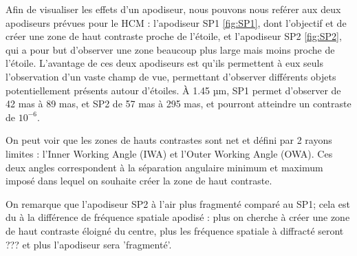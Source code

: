 Afin de visualiser les effets d'un apodiseur, nous pouvons nous reférer 
aux deux apodiseurs prévues pour le HCM : l'apodiseur SP1 \ref{fig:SP1}, dont l'objectif et de créer une zone de haut contraste proche de l'étoile, et l'apodiseur SP2 \ref{fig:SP2}, qui a pour but d'observer une zone beaucoup plus large mais moins proche de l'étoile. L'avantage de ces deux apodiseurs est qu'ils permettent à eux seuls l'observation d'un vaste champ de vue, permettant d'observer différents objets potentiellement présents autour d'étoiles. À 1.45 µm, SP1 permet d'observer de 42 mas à 89 mas, et SP2 de 57 mas à 295 mas, et pourront atteindre un contraste de $10^{-6}$.

On peut voir que les zones de hauts contrastes sont net et défini par 2 rayons limites : l'Inner Working Angle (IWA) et l'Outer Working Angle (OWA). Ces deux angles correspondent à la séparation angulaire minimum et maximum imposé dans lequel on souhaite créer la zone de haut contraste.



On remarque que l'apodiseur SP2 à l'air plus fragmenté comparé au SP1; cela est du à la différence de fréquence spatiale apodisé : plus on cherche à créer une zone de haut contraste éloigné du centre, plus les fréquence spatiale à diffracté seront ??? et plus l'apodiseur sera 'fragmenté'. %


